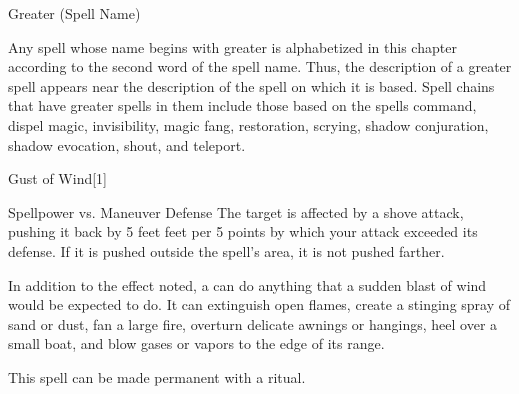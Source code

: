 \begin{spellsection}{Greater (Spell Name)}
    \par Any spell whose name begins with greater is alphabetized in this chapter according to the second word of the spell name. Thus, the description of a greater spell appears near the description of the spell on which it is based. Spell chains that have greater spells in them include those based on the spells command, dispel magic, invisibility, magic fang, restoration, scrying, shadow conjuration, shadow evocation, shout, and teleport.
\end{spellsection}

\begin{spellsection}{Gust of Wind}[1]
    \begin{spellheader}
    \end{spellheader}
    \begin{spellcontent}
        \begin{spelltargetinginfo}
        \end{spelltargetinginfo}
        \begin{spelleffects}
            \begin{spellattack}{Spellpower vs. Maneuver Defense}
                \spellsuccess The target is affected by a shove attack, pushing it back by 5 feet  feet per 5 points by which your attack exceeded its defense. If it is pushed outside the spell's area, it is not pushed farther.
            \end{spellattack}
        \end{spelleffects}
    \end{spellcontent}
    \begin{spellfooter}
        \spellnotes In addition to the effect noted, a  can do anything that a sudden blast of wind would be expected to do. It can extinguish open flames, create a stinging spray of sand or dust, fan a large fire, overturn delicate awnings or hangings, heel over a small boat, and blow gases or vapors to the edge of its range.

        This spell can be made permanent with a  ritual.
        \miscastexplode
    \end{spellfooter}
\end{spellsection}

